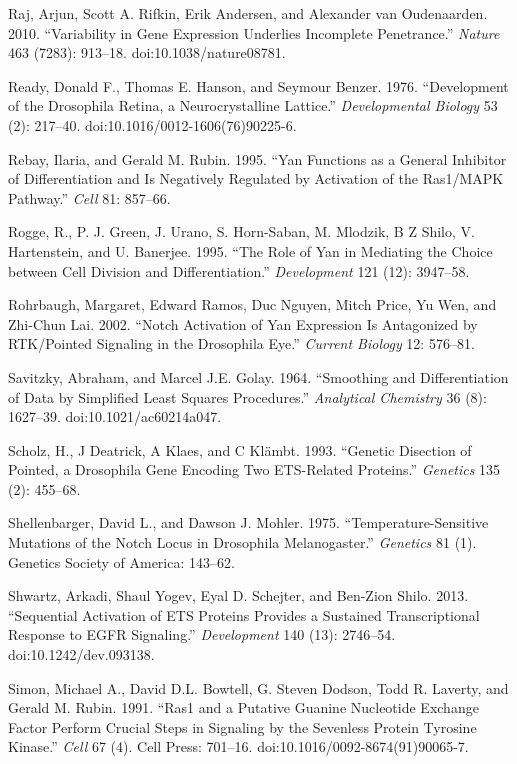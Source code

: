 Raj, Arjun, Scott A. Rifkin, Erik Andersen, and Alexander van Oudenaarden. 2010. ``Variability in Gene Expression Underlies Incomplete Penetrance.'' \emph{Nature} 463 (7283): 913--18. doi:10.1038/nature08781.

Ready, Donald F., Thomas E. Hanson, and Seymour Benzer. 1976. ``Development of the Drosophila Retina, a Neurocrystalline Lattice.'' \emph{Developmental Biology} 53 (2): 217--40. doi:10.1016/0012-1606(76)90225-6.

Rebay, Ilaria, and Gerald M. Rubin. 1995. ``Yan Functions as a General Inhibitor of Differentiation and Is Negatively Regulated by Activation of the Ras1/MAPK Pathway.'' \emph{Cell} 81: 857--66.

Rogge, R., P. J. Green, J. Urano, S. Horn-Saban, M. Mlodzik, B Z Shilo, V. Hartenstein, and U. Banerjee. 1995. ``The Role of Yan in Mediating the Choice between Cell Division and Differentiation.'' \emph{Development} 121 (12): 3947--58.

Rohrbaugh, Margaret, Edward Ramos, Duc Nguyen, Mitch Price, Yu Wen, and Zhi-Chun Lai. 2002. ``Notch Activation of Yan Expression Is Antagonized by RTK/Pointed Signaling in the Drosophila Eye.'' \emph{Current Biology} 12: 576--81.

Savitzky, Abraham, and Marcel J.E. Golay. 1964. ``Smoothing and Differentiation of Data by Simplified Least Squares Procedures.'' \emph{Analytical Chemistry} 36 (8): 1627--39. doi:10.1021/ac60214a047.

Scholz, H., J Deatrick, A Klaes, and C Klämbt. 1993. ``Genetic Disection of Pointed, a Drosophila Gene Encoding Two ETS-Related Proteins.'' \emph{Genetics} 135 (2): 455--68.

Shellenbarger, David L., and Dawson J. Mohler. 1975. ``Temperature-Sensitive Mutations of the Notch Locus in Drosophila Melanogaster.'' \emph{Genetics} 81 (1). Genetics Society of America: 143--62.

Shwartz, Arkadi, Shaul Yogev, Eyal D. Schejter, and Ben-Zion Shilo. 2013. ``Sequential Activation of ETS Proteins Provides a Sustained Transcriptional Response to EGFR Signaling.'' \emph{Development} 140 (13): 2746--54. doi:10.1242/dev.093138.

Simon, Michael A., David D.L. Bowtell, G. Steven Dodson, Todd R. Laverty, and Gerald M. Rubin. 1991. ``Ras1 and a Putative Guanine Nucleotide Exchange Factor Perform Crucial Steps in Signaling by the Sevenless Protein Tyrosine Kinase.'' \emph{Cell} 67 (4). Cell Press: 701--16. doi:10.1016/0092-8674(91)90065-7.

